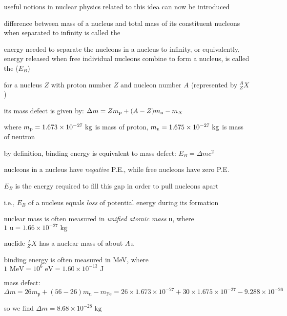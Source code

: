useful notions in nuclear physics related to this idea can now be introduced

\begin{ilight}
	difference between mass of a nucleus and total mass of its constituent nucleons when separated to infinity is called the 
\end{ilight}

\begin{ilight}
	energy needed to separate the nucleons in a nucleus to infinity, or equivalently, energy released when free individual nucleons combine to form a nucleus, is called the  ($E_B$)
\end{ilight}

\cmt for a nucleus $Z$ with proton number $Z$ and nucleon number $A$ (represented by $^A_Z X$)

its mass defect is given by: $\Delta m = Z m_\text{p} + (A-Z)m_\text{n} -m_X$

where $m_\text{p} = 1.673 \times 10^{-27} \text{ kg}$ is mass of proton, $m_\text{n} = 1.675 \times 10^{-27} \text{ kg}$ is mass of neutron

\cmt by definition, binding energy is equivalent to mass defect: $\boxed{E_B = \Delta m c^2}$

\cmt nucleons in a nucleus have \emph{negative} P.E., while free  nucleons have zero P.E.

$E_B$ is the energy required to fill this gap in order to pull nucleons apart

i.e., $E_B$ of a nucleus equals \emph{loss} of potential energy during its formation

\cmt nuclear mass is often measured in \emph{unified atomic mass} u, where $\boxed{1 \text{ u} = 1.66\times10^{-27} \text{ kg}}$

nuclide $^A_Z X$ has a nuclear mass of about $A\text{u}$

\cmt binding energy is often measured in MeV, where $\boxed{1 \text{ MeV} = 10^6 \text{ eV} = 1.60\times10^{-13} \text{ J}}$ 


\sol mass defect: $\Delta m = 26m_\text{p} + (56-26)m_\text{n} - m_\text{Fe} = 26\times 1.673\times10^{-27} + 30 \times1.675\times10^{-27} - 9.288 \times 10^{-26}$

so we find $\Delta m = 8.68 \times 10^{-28} \text{ kg}$


